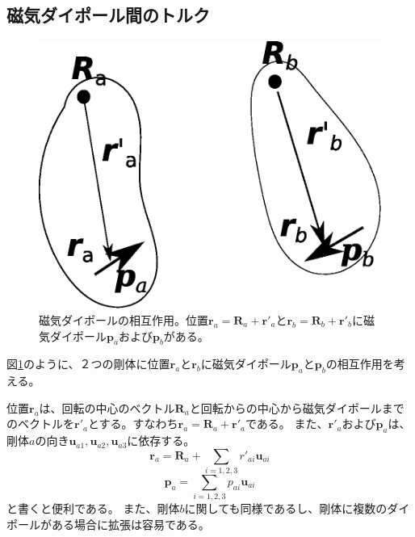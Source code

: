 \documentclass[a4paper,11pt]{jbook}
\begin{document}
\subsection{磁気ダイポール間のトルク}
\begin{figure}[h]
\centering
  \includegraphics[clip,width=0.6\linewidth]{pict/3_3_3_dipoles.eps}
  \caption{ 磁気ダイポールの相互作用。位置$\bm{r}_a=\bm{R}_a+\bm{r}'_a$と$\bm{r}_b=\bm{R}_b+\bm{r}'_b$に磁気ダイポール$\bm{p}_a$および$\bm{p}_b$がある。}
  \label{fig:3_3_3_dipoles}
\end{figure}
図\ref{fig:3_3_3_dipoles}のように、２つの剛体に位置$\bm{r}_a$と$\bm{r}_b$に磁気ダイポール$\bm{p}_a$と$\bm{p}_b$の相互作用を考える。

位置$\bm{r}_a$は、回転の中心のベクトル$\bm{R}_a$と回転からの中心から磁気ダイポールまでのベクトルを$\bm{r}'_a$とする。すなわち$\bm{r}_a=\bm{R}_a+\bm{r}'_a$である。
また、$\bm{r}'_a$および$\bm{p}_a$は、剛体$a$の向き$\bm{u}_{a1},\bm{u}_{a2},\bm{u}_{a3}$に依存する。
\begin{equation}
\bm{r}_a=\bm{R}_a+\sum_{i=1,2,3}r'_{ai}\bm{u}_{ai}
\end{equation}
\begin{equation}
\bm{p}_a=\sum_{i=1,2,3}p_{ai}\bm{u}_{ai}
\end{equation}
と書くと便利である。
また、剛体$b$に関しても同様であるし、剛体に複数のダイポールがある場合に拡張は容易である。
\end{document}
